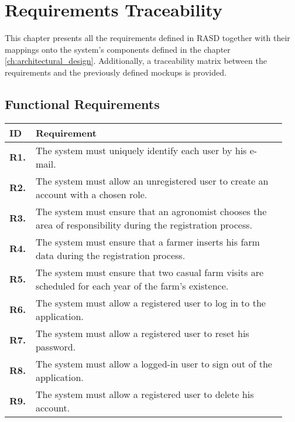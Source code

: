 \chapter{Requirements Traceability} \label{ch:requirements_traceability}

This chapter presents all the requirements defined in RASD together with their mappings onto the system's components defined in the chapter \ref{ch:architectural_design}. Additionally, a traceability matrix between the requirements and the previously defined mockups is provided.

\section{Functional Requirements}

\begin{longtable}{@{}p{0.06\linewidth} p{0.88\linewidth}}
	\toprule
	\textbf{ID}   & \textbf{Requirement}\\
	\midrule
	
	\textbf{R1.} & The system must uniquely identify each user by his e-mail. \\
	\textbf{R2.} & The system must allow an unregistered user to create an account with a chosen role. \\
	\textbf{R3.} & The system must ensure that an agronomist chooses the area of responsibility during the registration process. \\
	\textbf{R4.} & The system must ensure that a farmer inserts his farm data during the registration process.\\
	\textbf{R5.} & The system must ensure that two casual farm visits are scheduled for each year of the farm's existence.\\
	\textbf{R6.} & The system must allow a registered user to log in to the application. \\
	\textbf{R7.} & The system must allow a registered user to reset his password. \\
	\textbf{R8.} & The system must allow a logged-in user to sign out of the application. \\
	\textbf{R9.} & The system must allow a registered user to delete his account. \\
	

\end{longtable}
